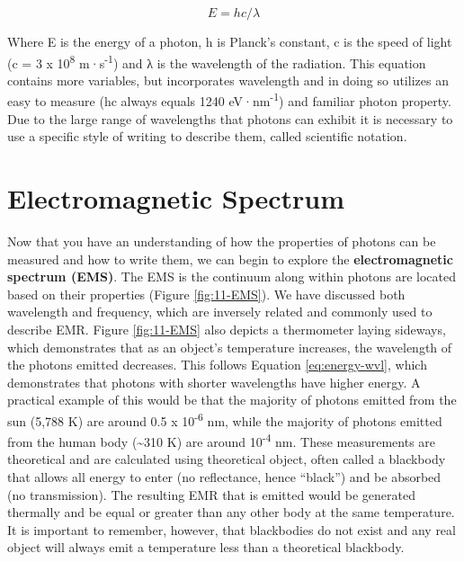 \documentclass[
]{book}
\begin{document}
\begin{equation}
E = hc/λ 
\label{eq:energy-wvl}
\end{equation}

Where E is the energy of a photon, h is Planck's constant, c is the speed of light (c = 3 x 10\textsuperscript{8} m·s\textsuperscript{-1}) and λ is the wavelength of the radiation. This equation contains more variables, but incorporates wavelength and in doing so utilizes an easy to measure (hc always equals 1240 eV·nm\textsuperscript{-1}) and familiar photon property. Due to the large range of wavelengths that photons can exhibit it is necessary to use a specific style of writing to describe them, called scientific notation.

\section{Electromagnetic Spectrum}\label{electromagnetic-spectrum}

Now that you have an understanding of how the properties of photons can be measured and how to write them, we can begin to explore the \textbf{electromagnetic spectrum (EMS)}. The EMS is the continuum along within photons are located based on their properties (Figure \ref{fig:11-EMS}). We have discussed both wavelength and frequency, which are inversely related and commonly used to describe EMR. Figure \ref{fig:11-EMS} also depicts a thermometer laying sideways, which demonstrates that as an object's temperature increases, the wavelength of the photons emitted decreases. This follows Equation \eqref{eq:energy-wvl}, which demonstrates that photons with shorter wavelengths have higher energy. A practical example of this would be that the majority of photons emitted from the sun (5,788 K) are around 0.5 x 10\textsuperscript{-6} nm, while the majority of photons emitted from the human body (\textasciitilde310 K) are around 10\textsuperscript{-4} nm. These measurements are theoretical and are calculated using theoretical object, often called a blackbody that allows all energy to enter (no reflectance, hence ``black'') and be absorbed (no transmission). The resulting EMR that is emitted would be generated thermally and be equal or greater than any other body at the same temperature. It is important to remember, however, that blackbodies do not exist and any real object will always emit a temperature less than a theoretical blackbody.
\end{document}
